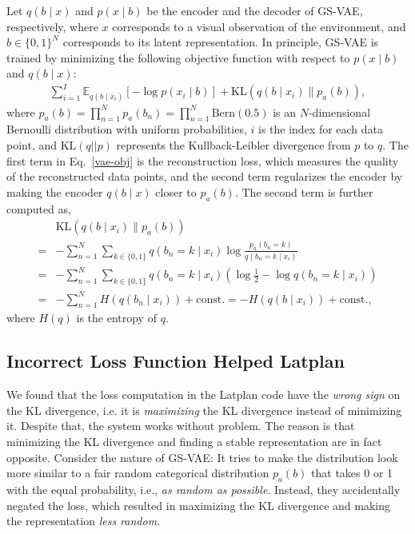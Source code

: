 
Let $q(b \mid x)$ and $p(x \mid b)$ be the encoder and the decoder of GS-VAE, respectively,
where $x$ corresponds to a visual observation of the environment, and $b\in\{0,1\}^N$ corresponds to its latent representation.
In principle, GS-VAE is trained by minimizing the following objective function with respect to $p(x \mid b)$ and $q(b\mid x)$:
\begin{align}
\label{vae-obj} \sum_{i=1}^I \mathbb{E}_{q(b\mid x_i)}\left[-\log p(x_i\mid b)\right] + \mathrm{KL}(q(b\mid x_i) \parallel p_a(b)),
\end{align}
where $p_a(b) = \prod_{n=1}^N p_a(b_n) = \prod_{n=1}^N \mathrm{Bern}(0.5)$ is an $N$-dimensional Bernoulli distribution with uniform probabilities, 
$i$ is the index for each data point, and $\mathrm{KL}(q || p)$ represents the Kullback-Leibler divergence from $p$ to $q$.
The first term in Eq.~\eqref{vae-obj} is the reconstruction loss, which measures the quality of the reconstructed data points,
and the second term regularizes the encoder by making the encoder $q(b\mid x)$ closer to $p_a(b)$.
The second term is further computed as,
\begin{align*}
 &{\mathrm{KL}}(q(b\mid x_i) \parallel p_a(b)) \\
= & - \sum_{n=1}^N \sum_{k\in\{0,1\}}q(b_{n}=k \mid x_i) \log\frac{p_a(b_{n}=k)}{q(b_{n}=k \mid x_i)}\\
=& - \sum_{n=1}^N \sum_{k\in\{0,1\}}q(b_{n}=k \mid x_i) \left(\log \frac{1}{2} - \log{q(b_{n}=k \mid x_i)}\right)\\
=& - \sum_{n=1}^N H(q(b_n\mid x_i)) + \mathrm{const.} = -H(q(b \mid x_i)) + \mathrm{const.},
\end{align*}
where $H(q)$ is the entropy of $q$.

\subsection{Incorrect Loss Function Helped Latplan}

We found that the loss computation in the Latplan code have the \emph{wrong sign} on the KL divergence,
i.e. it is \emph{maximizing} the KL divergence instead of minimizing it.
Despite that, the system works without problem.
% 
The reason is that minimizing the KL divergence and finding a stable representation are in fact opposite.
Consider the nature of GS-VAE:
It tries to make the distribution look more similar to a fair random categorical distribution $p_a(b)$
that takes 0 or 1 with the equal probability, i.e., \emph{as random as possible}.
Instead, they accidentally negated the loss, which resulted in
maximizing the KL divergence and making the representation \emph{less random}.

